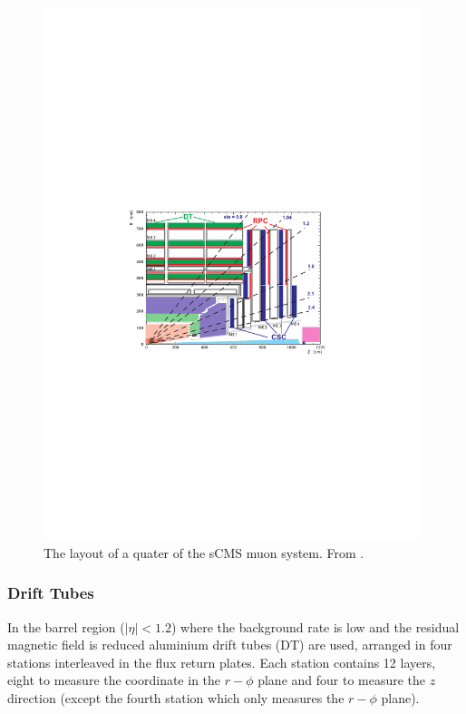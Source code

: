 \begin{figure}[htbp]
  \centering
  \includegraphics[width=0.98\textwidth]{muon_system}
  \caption{The layout of a quater of the s{CMS} muon system. From \cite{tdr}.}
  \label{fig:muon_system}
\end{figure}

\subsubsection{Drift Tubes}
In the barrel region ($|\eta| < 1.2$)
where the background rate is low and the residual magnetic field is reduced
 aluminium drift tubes (DT) are used,
arranged in four stations interleaved in the flux return
plates. 
Each station contains 12 layers, eight to measure the coordinate in the
$r-\phi$ plane and four to measure the $z$ direction (except the fourth station
which only measures the $r-\phi$ plane). 

